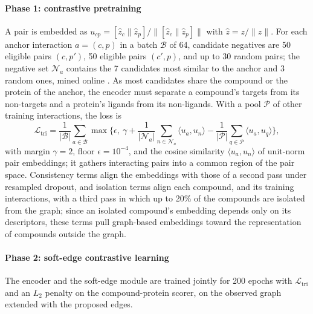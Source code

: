\documentclass[10pt,letterpaper]{article}
\begin{document}
\paragraph{Phase 1: contrastive pretraining}
A pair is embedded as $u_{cp}=[\hat{z}_c\|\hat{z}_p]/\|[\hat{z}_c\|\hat{z}_p]\|$ with $\hat{z}=z/\|z\|$. For each anchor interaction $a=(c,p)$ in a batch $\mathcal{B}$ of 64, candidate negatives are 50 eligible pairs $(c,p')$, 50 eligible pairs $(c',p)$, and up to 30 random pairs; the negative set $\mathcal{N}_a$ contains the 7 candidates most similar to the anchor and 3 random ones, mined online \cite{schroff2015facenet, hermans2017defense}. As most candidates share the compound or the protein of the anchor, the encoder must separate a compound's targets from its non-targets and a protein's ligands from its non-ligands. With a pool $\mathcal{P}$ of other training interactions, the loss is
\begin{equation}
\mathcal{L}_{\text{tri}} = \frac{1}{|\mathcal{B}|}\sum_{a\in\mathcal{B}} \max\!\Big\{\epsilon,\ \gamma + \frac{1}{|\mathcal{N}_a|}\sum_{n\in\mathcal{N}_a} \langle u_a,u_n\rangle - \frac{1}{|\mathcal{P}|}\sum_{q\in\mathcal{P}} \langle u_a,u_q\rangle \Big\},
\label{eq:triplet}
\end{equation}
with margin $\gamma=2$, floor $\epsilon=10^{-4}$, and the cosine similarity $\langle u_a,u_n\rangle$ of unit-norm pair embeddings; it gathers interacting pairs into a common region of the pair space. Consistency terms align the embeddings with those of a second pass under resampled dropout, and isolation terms align each compound, and its training interactions, with a third pass in which up to 20\% of the compounds are isolated from the graph; since an isolated compound's embedding depends only on its descriptors, these terms pull graph-based embeddings toward the representation of compounds outside the graph.

\paragraph{Phase 2: soft-edge contrastive learning}
The encoder and the soft-edge module are trained jointly for 200 epochs with $\mathcal{L}_{\text{tri}}$ and an $L_2$ penalty on the compound-protein scorer, on the observed graph extended with the proposed edges.
\end{document}
